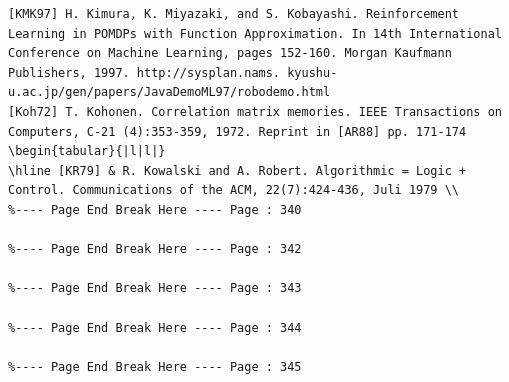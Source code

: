 \documentclass[10pt]{article}
\begin{document}
\begin{verbatim}
[KMK97] H. Kimura, K. Miyazaki, and S. Kobayashi. Reinforcement Learning in POMDPs with Function Approximation. In 14th International Conference on Machine Learning, pages 152-160. Morgan Kaufmann Publishers, 1997. http://sysplan.nams. kyushu-u.ac.jp/gen/papers/JavaDemoML97/robodemo.html
[Koh72] T. Kohonen. Correlation matrix memories. IEEE Transactions on Computers, C-21 (4):353-359, 1972. Reprint in [AR88] pp. 171-174
\begin{tabular}{|l|l|}
\hline [KR79] & R. Kowalski and A. Robert. Algorithmic = Logic + Control. Communications of the ACM, 22(7):424-436, Juli 1979 \\
%---- Page End Break Here ---- Page : 340

%---- Page End Break Here ---- Page : 342

%---- Page End Break Here ---- Page : 343

%---- Page End Break Here ---- Page : 344

%---- Page End Break Here ---- Page : 345


\end{verbatim}
\end{document}
